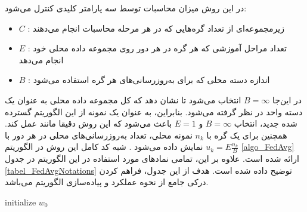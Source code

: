 در این روش میزان محاسبات توسط سه پارامتر کلیدی کنترل می‌شود:
\begin{itemize}
	\itemsep-1mm 
	\item
	$C$%
: زیرمجموعه‌ای از تعداد گره‌هایی که در هر مرحله محاسبات انجام می‌دهند

	\item
	$E$%
: تعداد مراحل آموزشی که هر گره در هر دور روی مجموعه داده محلی خود انجام می‌دهد
	
	\item
	$B$%
: اندازه دسته محلی که برای به‌روزرسانی‌های هر گره استفاده می‌شود
	
\end{itemize}
در این‌جا
$B = \infty$
انتخاب می‌شود تا نشان دهد که کل مجموعه داده محلی به عنوان یک دسته واحد در نظر گرفته می‌شود. بنابراین، به عنوان یک نمونه از این الگوریتم گسترده شده جدید، انتخاب
$B = \infty$
و
$E = 1$
باعث می‌شود که این روش دقیقا مانند
عمل کند. همچنین برای یک گره با
$n_k$
نمونه محلی، تعداد به‌روزرسانی‌های محلی در هر دور با
$u_k=E \frac{n_k}{B}$
نمایش داده می‌شود
\cite{mcmahan2017communication}.
شبه کد کامل این روش در الگوریتم
\ref{algo_FedAvg}
ارائه شده است. علاوه بر این، تمامی نمادهای مورد استفاده در این الگوریتم در جدول
\ref{tabel_FedAvgNotations}
توضیح داده شده است. هدف از این جدول، فراهم کردن درکی جامع از نحوه عملکرد و پیاده‌سازی الگوریتم می‌باشد.


\begin{LTR}
\begin{algorithm}[t]
	\begin{RTL}
		\caption{%
میانگین‌گیری فدرال
			\cite{mcmahan2017communication}
		}
		\label{algo_FedAvg}
	\end{RTL}
	
	\begin{latin}
		initialize $w_0$\;
	\end{latin}
\end{algorithm}
\end{LTR}


